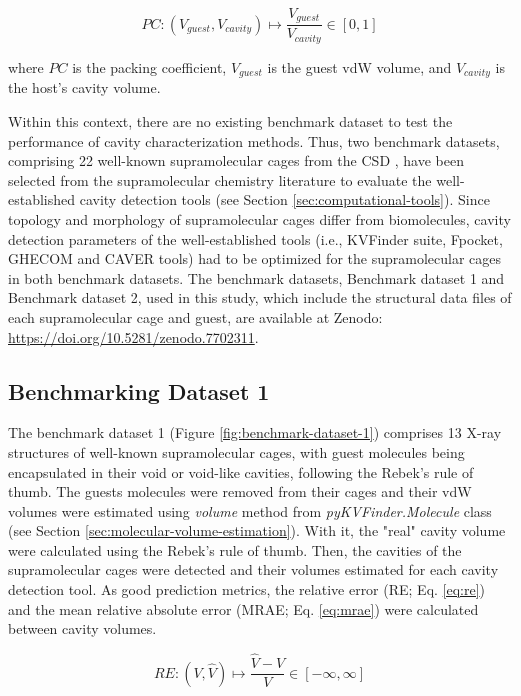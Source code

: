 \documentclass[Ingles]{phdthesis}
\def\ie{i.e.\onedot}
\begin{document}
\begin{equation}
  PC \colon (V_{guest},V_{cavity}) \mapsto \frac{V_{guest}}{V_{cavity}} \in [0,1]
  \label{eq:packing-coefficient}
\end{equation}

\noindent where $PC$ is the packing coefficient, $V_{guest}$ is the guest \acs{vdW} volume, and $V_{cavity}$ is the host's cavity volume.

Within this context, there are no existing benchmark dataset to test the performance of cavity characterization methods. Thus, two benchmark datasets, comprising 22 well-known supramolecular cages from the \ac{CSD} \cite{csd}, have been selected from the supramolecular chemistry literature to evaluate the well-established cavity detection tools (see Section \ref{sec:computational-tools}). Since topology and morphology of supramolecular cages differ from biomolecules, cavity detection parameters of the well-established tools (\ie, KVFinder suite, Fpocket, GHECOM and CAVER tools) had to be optimized for the supramolecular cages in both benchmark datasets. The benchmark datasets, Benchmark dataset 1 and Benchmark dataset 2, used in this study, which include the structural data files of each supramolecular cage and guest, are available at Zenodo: \url{https://doi.org/10.5281/zenodo.7702311}.

\subsection{Benchmarking Dataset 1}

The benchmark dataset 1 (Figure \ref{fig:benchmark-dataset-1}) comprises 13 X-ray structures of well-known supramolecular cages, with guest molecules being encapsulated in their void or void-like cavities, following the Rebek's rule of thumb. The guests molecules were removed from their cages and their \acs{vdW} volumes were estimated using \textit{volume} method from \textit{pyKVFinder.Molecule} class (see Section \ref{sec:molecular-volume-estimation}). With it, the "real" cavity volume were calculated using the Rebek's rule of thumb. Then, the cavities of the supramolecular cages were detected and their volumes estimated for each cavity detection tool. As good prediction metrics, the relative error (\acs{RE}; Eq. \ref{eq:re}) and the mean relative absolute error (\acs{MRAE}; Eq. \ref{eq:mrae}) were calculated between cavity volumes.

\begin{equation}
  RE \colon (V,\hat{V}) \mapsto \frac{\hat{V} - V}{V} \in [-\infty,\infty]
  \label{eq:re}
\end{equation}
\end{document}
